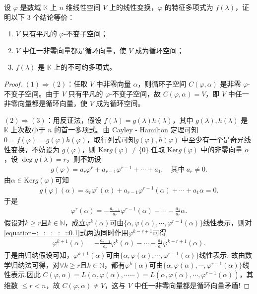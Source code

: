 \documentclass[../../main.tex]{subfiles}%
\begin{document}
\begin{proposition}\label{proposition:特征多项式是不可约多项式的刻画}
设 $\varphi$ 是数域 $\mathbb{K}$ 上 $n$ 维线性空间 $V$ 上的线性变换，$\varphi$ 的特征多项式为 $f(\lambda)$，证明以下 3 个结论等价：
\begin{enumerate}[(1)]
\item $V$ 只有平凡的 $\varphi$-不变子空间；

\item $V$ 中任一非零向量都是循环向量，使 $V$ 成为循环空间；

\item $f(\lambda)$ 是 $\mathbb{K}$ 上的不可约多项式。
\end{enumerate}
\end{proposition}
\begin{proof}

$(1)\Rightarrow(2)$：任取 $V$ 中非零向量 $\alpha$，则循环子空间 $C(\varphi,\alpha)$ 是非零 $\varphi$-不变子空间。由于 $V$ 只有平凡的 $\varphi$-不变子空间，故 $C(\varphi,\alpha)=V$，即 $V$ 中任一非零向量都是循环向量，使 $V$ 成为循环空间。

$(2)\Rightarrow(3)$：用反证法，假设 $f(\lambda)=g(\lambda)h(\lambda)$，其中 $g(\lambda),h(\lambda)$ 是 $\mathbb{K}$ 上次数小于 $n$ 的首一多项式。由 Cayley - Hamilton 定理可知 $0=f(\varphi)=g(\varphi)h(\varphi)$，取行列式可知$g(\varphi),h(\varphi)$ 中至少有一个是奇异线性变换，不妨设为 $g(\varphi)$，则 $\mathrm{Ker}g(\varphi)\neq \{0\}$.任取 $\mathrm{Ker}g(\varphi)$ 中的非零向量 $\alpha$，设 $\deg g(\lambda)=r$，则不妨设
\begin{align*}
g(\varphi) = a_r \varphi^r + a_{r-1} \varphi^{r-1} + \cdots + a_1, \quad \text{其中} \ a_r \neq 0.
\end{align*}
由$\alpha \in \mathrm{Ker} g(\varphi)$可知
\begin{align*}
g(\varphi)(\alpha) = a_r \varphi^r(\alpha) + a_{r-1} \varphi^{r-1}(\alpha) + \cdots + a_1 \alpha = 0.
\end{align*}
于是
\begin{align}
\varphi^r(\alpha) = -\frac{a_{r-1}}{a_r} \varphi^{r-1}(\alpha) - \cdots - \frac{a_1}{a_r} \alpha. \label{equation--:_:_:_:_::0.1}
\end{align}
假设对$k \geqslant  r$且$k \in \mathbb{N}$，成立$\varphi^k(\alpha)$可由$\{ \alpha, \varphi(\alpha), \cdots, \varphi^{r-1}(\alpha) \}$线性表示，则对\eqref{equation--:_:_:_:_::0.1}式两边同时作用$\varphi^{k-r+1}$可得
\begin{align*}
\varphi^{k+1}(\alpha) = -\frac{a_{r-1}}{a_r} \varphi^k(\alpha) - \cdots - \frac{a_1}{a_r} \varphi^{k-r+1}(\alpha).
\end{align*}
于是由归纳假设可知，$\varphi^{k+1}(\alpha)$可由$\{ \alpha, \varphi(\alpha), \cdots, \varphi^{r-1}(\alpha) \}$线性表示. 故由数学归纳法可得，对$\forall k \geqslant  r$且$k \in \mathbb{N}$，都有$\varphi^k(\alpha)$可由$\{ \alpha, \varphi(\alpha), \cdots, \varphi^{r-1}(\alpha) \}$线性表示.因此
$C(\varphi ,\alpha )=L(\alpha ,\varphi (\alpha ),\cdots \cdots )=L(\alpha ,\varphi (\alpha ),\cdots ,\varphi ^{r-1}(\alpha ))$，其维数 $\leqslant  r < n$，故 $C(\varphi,\alpha)\neq V$，这与 $V$ 中任一非零向量都是循环向量矛盾!


\end{proof}
\end{document}
